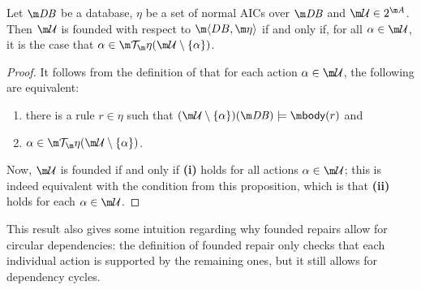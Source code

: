 \begin{proposition}
  \label{prop:founded-char}
  Let $\db$ be a database, $\eta$ be a set of normal AICs over $\db$ and $\UU\in 2^{\acts}$. %
  Then $\UU$ is founded with respect to $\fulldb$ if and only if, for all $\alpha\in\UU$, it is the case that $\alpha\in\Op(\UU\setminus\{\alpha\})$.
\end{proposition}
\begin{proof}
  It follows from the definition of \Op that for each action $\alpha\in \UU$, the following are equivalent:
  \begin{enumerate}
   \item there is a rule $r\in\eta$ such that $(\UU\setminus\{\alpha\})(\db)\models\body(r)$ and 
   \item $\alpha\in\Op(\UU\setminus\{\alpha\})$.
  \end{enumerate}
  Now, $\UU$ is founded if and only if \textbf{(i)} holds for all actions $\alpha\in \UU$; this is indeed equivalent with the condition from this proposition, which is that \textbf{(ii)} holds for each $\alpha\in \UU$. 
\end{proof} 

This result also gives some intuition regarding why founded repairs allow for circular dependencies: the definition of founded repair only checks that each individual action is supported by the remaining ones, but it still allows for dependency cycles.

